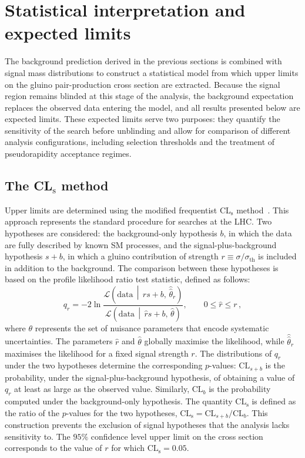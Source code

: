 \clearpage


\section{Statistical interpretation and expected limits}
\label{sec:limits}

The background prediction derived in the previous sections is combined with signal mass distributions to construct a statistical model from which upper limits on the gluino pair-production cross section are extracted. Because the signal region remains blinded at this stage of the analysis, the background expectation replaces the observed data entering the model, and all results presented below are expected limits. These expected limits serve two purposes: they quantify the sensitivity of the search before unblinding and allow for comparison of different analysis configurations, including selection thresholds and the treatment of pseudorapidity acceptance regimes.


\subsection{The \texorpdfstring{CL$_\text{s}$}{CLs} method}
\label{sec:limits:cls}

Upper limits are determined using the modified frequentist CL$_\text{s}$ method~\cite{CLSpaper}. This approach represents the standard procedure for searches at the LHC. Two hypotheses are considered: the background-only hypothesis $b$, in which the data are fully described by known SM processes, and the signal-plus-background hypothesis $s+b$, in which a gluino contribution of strength $r \equiv \sigma/ \sigma_\mathrm{th}$ is included in addition to the background. The comparison between these hypotheses is based on the profile likelihood ratio test statistic, defined as follows:
\begin{equation}
    q_r = -2 \ln \frac{\mathcal{L}\left(\text{data} \,\middle|\, r s + b,\, \hat{\hat{\theta}}_r\right)}{\mathcal{L}\left(\text{data} \,\middle|\, \hat{r} s + b,\, \hat{\theta}\right)},
    \qquad 0 \leq \hat{r} \leq r\,,
    \label{eq:limits:qmu}
\end{equation}
where $\theta$ represents the set of nuisance parameters that encode systematic uncertainties. The parameters $\hat{r}$ and $\hat{\theta}$ globally maximise the likelihood, while $\hat{\hat{\theta}}_r$ maximises the likelihood for a fixed signal strength $r$. The distributions of $q_r$ under the two hypotheses determine the corresponding $p$-values: $\text{CL}_{s+b}$ is the probability, under the signal-plus-background hypothesis, of obtaining a value of $q_r$ at least as large as the observed value. Similarly, $\text{CL}_b$ is the probability computed under the background-only hypothesis. The quantity CL$_\text{s}$ is defined as the ratio of the $p$-values for the two hypotheses, $\textrm{CL$_\text{s}$} = \text{CL}_{s+b}/\text{CL}_b$. This construction prevents the exclusion of signal hypotheses that the analysis lacks sensitivity to. The $95\%$ confidence level upper limit on the cross section corresponds to the value of $r$ for which $\textrm{CL$_\text{s}$} = 0.05$.

